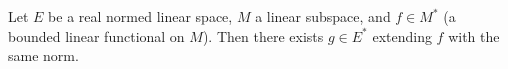 Let $E$ be a real normed linear space, $M$ a linear subspace, and $f \in M^*$ (a bounded linear functional on $M$). Then there exists $g \in E^*$ extending $f$ with the same norm.
